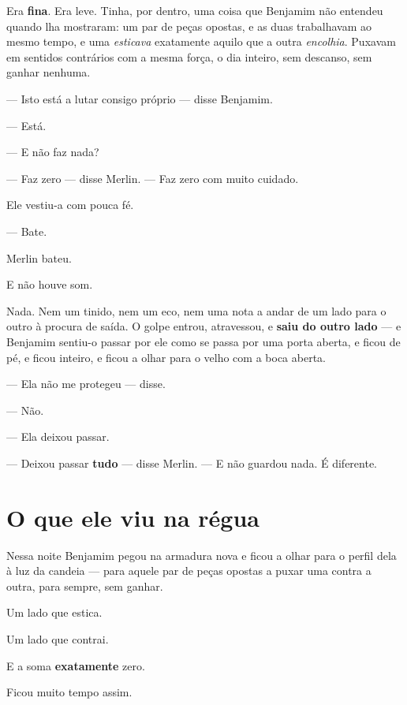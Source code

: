 \documentclass[livro.tex]{subfiles}
\begin{document}
Era \textbf{fina}. Era leve. Tinha, por dentro, uma coisa que Benjamim não entendeu quando lha mostraram: um par de
peças opostas, e as duas trabalhavam ao mesmo tempo, e uma \emph{esticava} exatamente aquilo que a outra
\emph{encolhia}. Puxavam em sentidos contrários com a mesma força, o dia inteiro, sem descanso, sem ganhar nenhuma.

--- Isto está a lutar consigo próprio --- disse Benjamim.

--- Está.

--- E não faz nada?

--- Faz zero --- disse Merlin. --- Faz zero com muito cuidado.

\medskip

Ele vestiu-a com pouca fé.

--- Bate.

\medskip

Merlin bateu.

\medskip

E não houve som.

\medskip

Nada. Nem um tinido, nem um eco, nem uma nota a andar de um lado para o outro à procura de saída. O golpe entrou,
atravessou, e \textbf{saiu do outro lado} --- e Benjamim sentiu-o passar por ele como se passa por uma porta
aberta, e ficou de pé, e ficou inteiro, e ficou a olhar para o velho com a boca aberta.

\medskip

--- Ela não me protegeu --- disse.

--- Não.

--- Ela deixou passar.

--- Deixou passar \textbf{tudo} --- disse Merlin. --- E não guardou nada. É diferente.

\section*{O que ele viu na régua}

Nessa noite Benjamim pegou na armadura nova e ficou a olhar para o perfil dela à luz da candeia --- para aquele par
de peças opostas a puxar uma contra a outra, para sempre, sem ganhar.

Um lado que estica.

Um lado que contrai.

E a soma \textbf{exatamente} zero.

\medskip

Ficou muito tempo assim.
\end{document}
